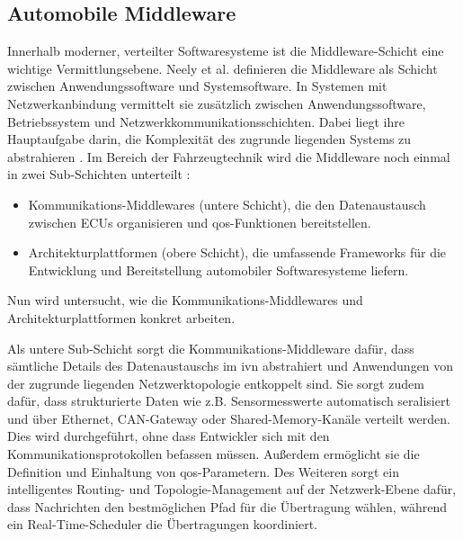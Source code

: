 \subsection{Automobile Middleware}
\label{subsect:middle}
Innerhalb moderner, verteilter Softwaresysteme ist die Middleware-Schicht eine wichtige Vermittlungsebene. Neely et al. \cite{neely2006adaptive} definieren die Middleware als Schicht zwischen Anwendungssoftware und Systemsoftware. In Systemen mit Netzwerkanbindung vermittelt sie zusätzlich zwischen Anwendungssoftware, Betriebssystem und Netzwerkkommunikationsschichten. Dabei liegt ihre Hauptaufgabe darin, die Komplexität des zugrunde liegenden Systems zu abstrahieren \cite{neely2006adaptive}. Im Bereich der Fahrzeugtechnik wird die Middleware noch einmal in zwei Sub-Schichten unterteilt \cite{kluner2024moderna}:
\begin{itemize}
  \item Kommunikations-Middlewares (untere Schicht), die den Datenaustausch zwischen ECUs organisieren und \gls{qos}-Funktionen bereitstellen.
  \item Architekturplattformen (obere Schicht), die umfassende Frameworks für die Entwicklung und Bereitstellung automobiler Softwaresysteme liefern.
\end{itemize}
Nun wird untersucht, wie die Kommunikations-Middlewares und Architekturplattformen konkret arbeiten.

Als untere Sub-Schicht sorgt die Kommunikations-Middleware dafür, dass sämtliche Details des Datenaustauschs im \gls{ivn} abstrahiert und Anwendungen von der zugrunde liegenden Netzwerktopologie entkoppelt sind. Sie sorgt zudem dafür, dass strukturierte Daten wie z.B. Sensormesswerte automatisch seralisiert und über Ethernet, CAN-Gateway oder Shared-Memory-Kanäle verteilt werden. Dies wird durchgeführt, ohne dass Entwickler sich mit den Kommunikationsprotokollen befassen müssen. Außerdem ermöglicht sie die Definition und Einhaltung von \gls{qos}-Parametern. Des Weiteren sorgt ein intelligentes Routing- und Topologie-Management auf der Netzwerk-Ebene dafür, dass Nachrichten den bestmöglichen Pfad für die Übertragung wählen, während ein Real-Time-Scheduler die Übertragungen koordiniert.

